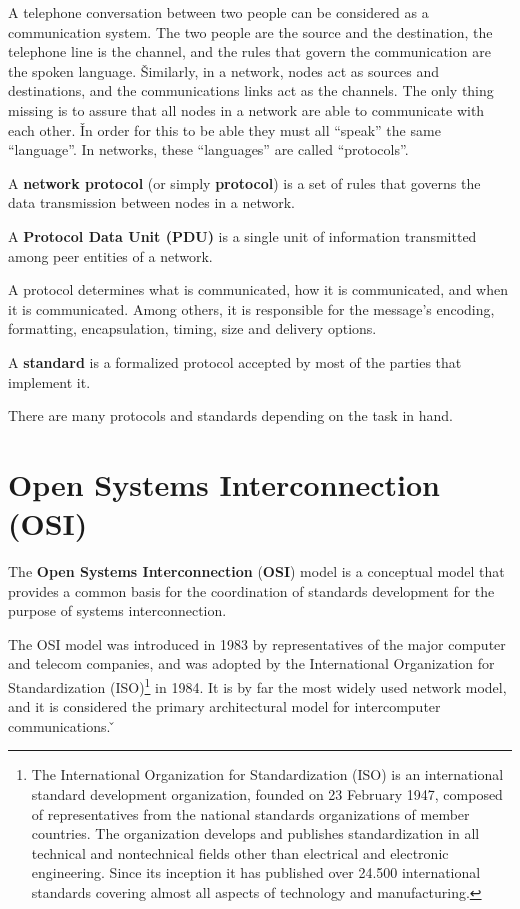 \be
A telephone conversation between two people can be considered as a communication system. The two people are the
source and the destination, the telephone line is the channel, and the rules that govern the communication are the
spoken language. \v

Similarly, in a network, nodes act as sources and destinations, and the communications links act as the channels. The
only thing missing is to assure that all nodes in a network are able to communicate with each other. \v

In order for this to be able they must all ``speak'' the same ``language''. In networks, these ``languages'' are
called ``protocols''.
\ee

A \textbf{network protocol} (or simply \textbf{protocol}) is a set of rules that governs the data transmission between
nodes in a network.
\ed

A \textbf{Protocol Data Unit (PDU)} is a single unit of information transmitted among peer entities of a network.
\ed

A protocol determines what is communicated, how it is communicated, and when it is communicated. Among others, it is
responsible for the message's encoding, formatting, encapsulation, timing, size and delivery options.

\bd[Standard]
A \textbf{standard} is a formalized protocol accepted by most of the parties that implement it.
\ed

There are many protocols and standards depending on the task in hand.

\section{Open Systems Interconnection (OSI)}

The \textbf{Open Systems Interconnection} (\textbf{OSI}) model is a conceptual model that provides a common basis for
the coordination of standards development for the purpose of systems interconnection.
\ed

The OSI model was introduced in 1983 by representatives of the major computer and telecom companies, and was adopted
by the International Organization for Standardization (ISO)\footnote{The International Organization for
Standardization (ISO) is an international standard development organization, founded on 23 February 1947, composed of
representatives from the national standards organizations of member countries. The organization develops and
publishes standardization in all technical and nontechnical fields other than electrical and electronic engineering.
Since its inception it has published over 24.500 international standards covering almost all aspects of technology
and manufacturing.} in 1984. It is by far the most widely used network model, and it is considered the primary
architectural model for intercomputer communications. \v

